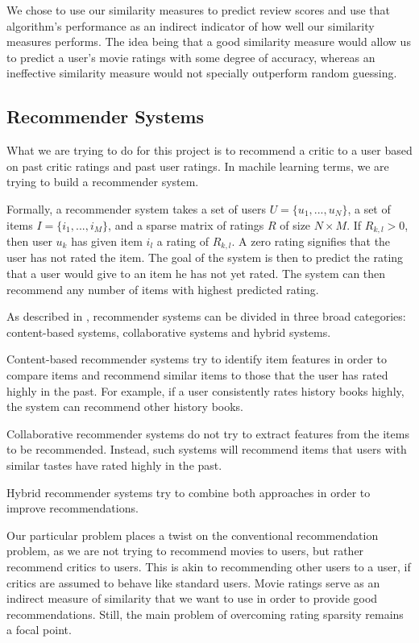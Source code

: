 \documentclass[12pt]{article}
\begin{document}
We chose to use our similarity measures to predict review scores and use that
algorithm's performance as an indirect indicator of how well our similarity
measures performs. The idea being that a good similarity measure would allow
us to predict a user's movie ratings with some degree of accuracy, whereas an
ineffective similarity measure would not specially outperform random guessing.

\subsection{Recommender Systems}

What we are trying to do for this project is to recommend a critic to a user
based on past critic ratings and past user ratings. In machile learning terms,
we are trying to build a recommender system.

Formally, a recommender system takes a set of users $U = \{u_1, ..., u_N\}$, a
set of items $I = \{i_1, ..., i_M\}$, and a sparse matrix of ratings
$R$ of size $N \times M$. If $R_{k,l} > 0$, then user $u_k$ has given item
$i_l$ a rating of $R_{k,l}$. A zero rating signifies that the
user has not rated the item. The goal of the system is then to predict the
rating that a user would give to an item he has not yet rated. The system can
then recommend any number of items with highest predicted rating.

As described in \cite{Survey05}, recommender systems can be divided in three
broad categories: content-based systems, collaborative systems and hybrid
systems. 

Content-based recommender systems try to identify item features in order to
compare items and recommend similar items to those that the user has rated
highly in the past.  For example, if a user consistently rates history books
highly, the system can recommend other history books.

Collaborative recommender systems do not try to extract features from the items
to be recommended. Instead, such systems will recommend items that users with
similar tastes have rated highly in the past.

Hybrid recommender systems try to combine both approaches in order to improve
recommendations.

Our particular problem places a twist on the conventional recommendation
problem, as we are not trying to recommend movies to users, but rather
recommend critics to users. This is akin to recommending other users
to a user, if critics are assumed to behave like standard users. Movie ratings
serve as an indirect measure of similarity that we want to use in order to
provide good recommendations. Still, the main problem of overcoming rating
sparsity remains a focal point.
\end{document}
